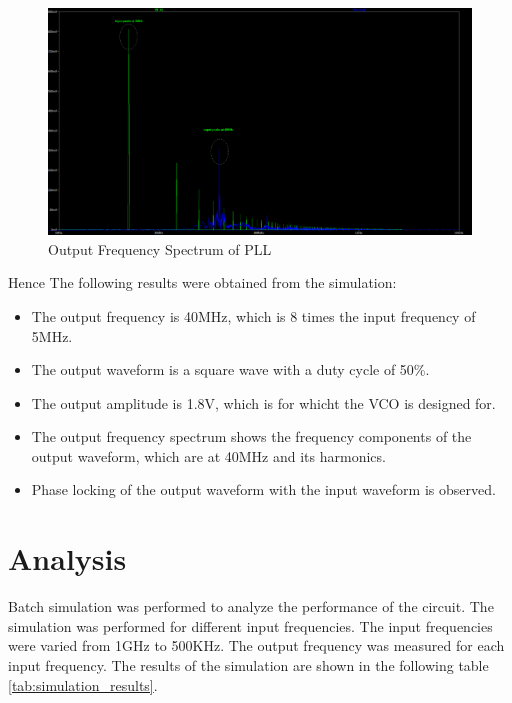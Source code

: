 \begin{figure}[H]
    \centering
    \includegraphics[width=1\linewidth]{figs/pllfftop2.png}
    \caption{Output Frequency Spectrum of PLL}
    \label{fig:output_frequency_spectrum}
    \vspace{0.5cm}
\end{figure}

Hence The following results were obtained from the simulation:
\begin{itemize}
    \item The output frequency is 40MHz, which is 8 times the input frequency of 5MHz.
    \item The output waveform is a square wave with a duty cycle of 50\%.
    \item The output amplitude is 1.8V, which is for whicht the VCO is designed for.
    \item The output frequency spectrum shows the frequency components of the output waveform, which are at 40MHz and its harmonics.
    \item Phase locking of the output waveform with the input waveform is observed.
\end{itemize}  

\section{Analysis}
Batch simulation was performed to analyze the performance of the circuit. The simulation was performed for different input frequencies. 
The input frequencies were varied from 1GHz to 500KHz. The output frequency was measured for each input frequency. The results of the simulation are shown in the following table \ref{tab:simulation_results}.

